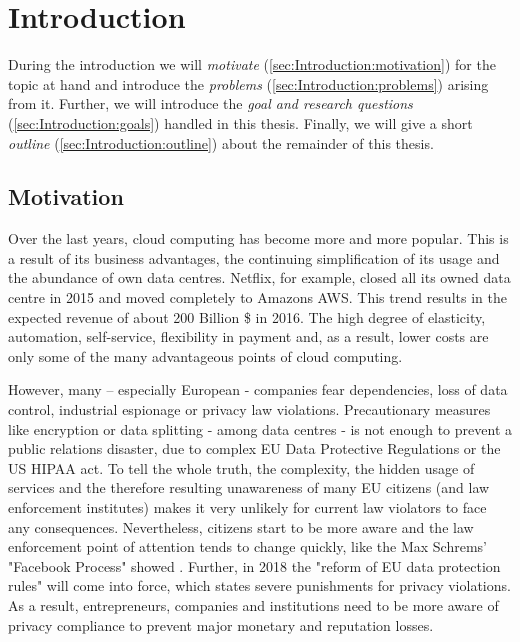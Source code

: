 
\chapter{Introduction}
\label{ch:Introduction}

During the introduction we will \textit{motivate} (\autoref{sec:Introduction:motivation}) for the topic at hand and introduce the \textit{problems} (\autoref{sec:Introduction:problems}) arising from it. Further, we will introduce the \textit{goal and research questions} (\autoref{sec:Introduction:goals}) handled in this thesis. Finally, we will give a short \textit{outline} (\autoref{sec:Introduction:outline}) about the remainder of this thesis.


\section{Motivation}
\label{sec:Introduction:motivation}

Over the last years, cloud computing has become more and more popular. This is a result of its business advantages, the continuing simplification of its usage and the abundance of own data centres. Netflix, for example, closed all its owned data centre in 2015 and moved completely to Amazons AWS\cite{DavidChernicoff.2015}. This trend results in the expected revenue of about 200 Billion \$ in 2016\cite{statista.com.2016}. The high degree of elasticity, automation, self-service, flexibility in payment and, as a result, lower costs are only some of the many advantageous points of cloud computing.\cite{Binz.2014}

However, many – especially European - companies fear dependencies, loss of data control, industrial espionage or privacy law violations. Precautionary measures like encryption or data splitting - among data centres - is not enough to prevent a public relations disaster, due to complex EU Data Protective Regulations\cite{personaldata.2011} or the US HIPAA act\cite{OfficeforCivilRights.20130726}. To tell the whole truth, the complexity, the hidden usage of services and the therefore resulting unawareness of many EU citizens (and law enforcement institutes) makes it very unlikely for current law violators to face any consequences. Nevertheless, citizens start to be more aware and the law enforcement point of attention tends to change quickly, like the Max Schrems' "Facebook Process" showed \cite{JuliaBahr.20150923}. Further, in 2018 the "reform of EU data protection rules" will come into force, which states severe punishments for privacy violations\cite{personaldata.2011}. As a result, entrepreneurs, companies and institutions need to be more aware of privacy compliance to prevent major monetary and reputation losses. 

